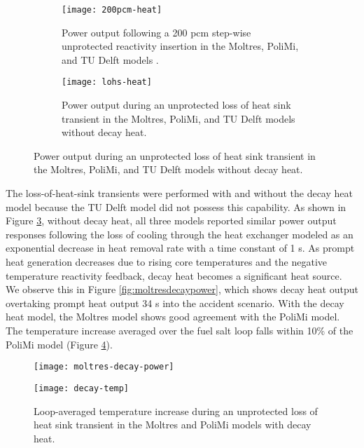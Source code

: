 \begin{figure}[htb!]
    \centering
    \begin{subfigure}[b]{.49\textwidth}
      \centering
      \texttt{[image: 200pcm-heat]}
      \caption{Power output following a 200 pcm step-wise unprotected reactivity
        insertion in the Moltres, PoliMi, and
        TU Delft models \cite{fiorina_modelling_2014}.}
      \label{fig:200pcmheat}
    \end{subfigure}
    \hfill
    \begin{subfigure}[b]{.49\textwidth}
      \centering
      \texttt{[image: lohs-heat]}
      \caption{Power output during
        an unprotected loss of heat sink transient in the Moltres, PoliMi, and
        TU Delft models \cite{fiorina_modelling_2014} without decay heat.}
      \label{fig:lohsheat}
    \end{subfigure}
\end{figure}

The loss-of-heat-sink transients were performed with and without the decay heat
model because the TU Delft model did not possess this capability. As shown in
Figure \ref{fig:lohsheat}, without decay heat, all three models reported
similar power output responses following the loss of cooling through the heat
exchanger modeled as an exponential decrease in heat removal rate with a time
constant of 1 s. As prompt heat generation decreases due to rising core
temperatures and the negative temperature reactivity feedback, decay heat
becomes a significant heat source. We observe this in Figure
\ref{fig:moltresdecaypower}, which shows decay heat output overtaking prompt
heat output 34 s into the accident scenario. With the decay heat model, the
Moltres model shows good agreement with the PoliMi model. The temperature
increase averaged over the fuel salt loop falls within 10\% of the PoliMi
model (Figure \ref{fig:polimidecaytemp}).

\begin{figure}[htb!]
	\centering
	\begin{minipage}[t]{0.485\columnwidth}
	    \texttt{[image: moltres-decay-power]}
	    \caption{Power output during
    an unprotected loss of heat sink transient in the Moltres model with
    decay heat.}
	    \label{fig:moltresdecaypower}
	\end{minipage}
	\hfill
	\begin{minipage}[t]{0.485\columnwidth}
	    \texttt{[image: decay-temp]}
	    \caption{Loop-averaged temperature increase during
    an unprotected loss of heat sink transient in the Moltres and PoliMi
    models \cite{fiorina_modelling_2014} with decay heat.}
	    \label{fig:polimidecaytemp}
	\end{minipage}
\end{figure}

